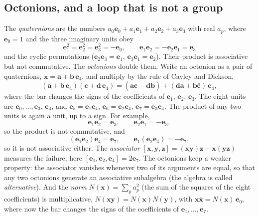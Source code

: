 \documentclass[aps,prd,twocolumn,superscriptaddress,nofootinbib,floatfix,longbibliography]{revtex4-2}
\newcommand{\e}[1]{\mathbf e_{#1}}
\begin{document}
\subsection{Octonions, and a loop that is not a group}
\label{sec:oct}

The \emph{quaternions} are the numbers $a_0\e0+a_1\e1+a_2\e2+a_3\e3$ with real $a_p$, where $\e0=1$ and the three
imaginary units obey
\begin{equation}
\e1^2=\e2^2=\e3^2=-\e0,\qquad \e1\e2=-\e2\e1=\e3
\label{eq:quat}
\end{equation}
and the cyclic permutations ($\e2\e3=\e1$, $\e3\e1=\e2$). Their product is associative but not commutative. The
\emph{octonions} double them. Write an octonion as a pair of quaternions, $\mathbf x=\mathbf a+\mathbf b\,\e4$, and
multiply by the rule of Cayley and Dickson,
\begin{equation}
(\mathbf a+\mathbf b\,\e4)(\mathbf c+\mathbf d\,\e4)=(\mathbf a\mathbf c-\bar{\mathbf d}\mathbf b)+(\mathbf d\mathbf a
+\mathbf b\bar{\mathbf c})\,\e4 ,
\label{eq:cd}
\end{equation}
where the bar changes the signs of the coefficients of $\e1$, $\e2$, $\e3$. The eight units are $\e0,\dots,\e3$, $\e4$,
and $\e5=\e1\e4$, $\e6=\e2\e4$, $\e7=\e3\e4$. The product of any two units is again a unit, up to a sign. For example,
\begin{equation}
\e1\e2=\e{3},\qquad \e2\e1=-\e{3},
\end{equation}
so the product is not commutative, and
\begin{equation}
(\e1\e2)\e4=\e{7},\qquad \e1(\e2\e4)=-\e{7},
\label{eq:nonassoc}
\end{equation}
so it is not associative either. The \emph{associator} $[\mathbf x,\mathbf y,\mathbf z]=(\mathbf x\mathbf y)\mathbf
z-\mathbf x(\mathbf y\mathbf z)$ measures the failure; here $[\e1,\e2,\e4]=2\e{7}$. The octonions keep
a weaker property: the associator vanishes whenever two of its arguments are equal, so that any two octonions generate
an associative subalgebra (the algebra is called \emph{alternative}). And the \emph{norm}
$N(\mathbf x)=\sum_pa_p^2$ (the sum of the squares of the eight coefficients) is multiplicative,
$N(\mathbf x\mathbf y)=N(\mathbf x)N(\mathbf y)$, with $\mathbf x\bar{\mathbf x}=N(\mathbf x)\,\e0$, where now the bar
changes the signs of the coefficients of $\e1,\dots,\e7$.
\end{document}
